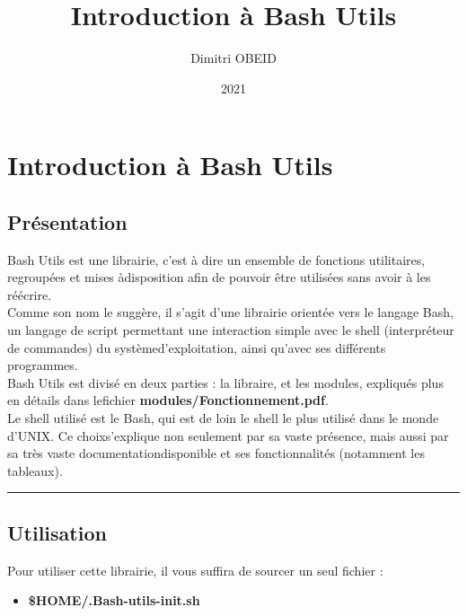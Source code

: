\documentclass[a4paper,10pt]{article}
\title{\color{red}Introduction à Bash Utils}\color{white}
\author{Dimitri OBEID}
\date{2021}
\begin{document}
\maketitle
\newpage

\hypertarget{contents}{}
\tableofcontents
\newpage

\color{red}
\section{Introduction à Bash Utils}\color{white}

\color{green}
\subsection{Présentation}\color{white}
Bash Utils est une librairie, c'est à dire un ensemble de fonctions utilitaires, regroupées et mises à\linebreak disposition afin de pouvoir être utilisées sans avoir à les réécrire.\\[1\baselineskip]

Comme son nom le suggère, il s'agit d'une librairie orientée vers le langage Bash, un langage de script permettant une interaction simple avec le shell (interpréteur de commandes) du système\linebreak d'exploitation, ainsi qu'avec ses différents programmes.\\[1\baselineskip]

Bash Utils est divisé en deux parties : la libraire, et les modules, expliqués plus en détails dans le\linebreak fichier \textbf{\color{lime}modules/Fonctionnement.pdf\color{white}}.\\[1\baselineskip]

Le shell utilisé est le Bash, qui est de loin le shell le plus utilisé dans le monde d'UNIX. Ce choix\linebreak s'explique non seulement par sa vaste présence, mais aussi par sa très vaste documentation\linebreak disponible et ses fonctionnalités (notamment les tableaux).\\[1\baselineskip]


\color{green}\par\noindent\rule{\textwidth}{0.4pt}\color{white}

\color{green}
\subsection{Utilisation}\color{white}
Pour utiliser cette librairie, il vous suffira de sourcer un seul fichier :
\begin{itemize}
    \item \color{orange}\textbf{\$HOME\color{lime}/.Bash-utils-init.sh\color{white}}\color{white}\\[1\baselineskip]
\end{itemize}
\end{document}
